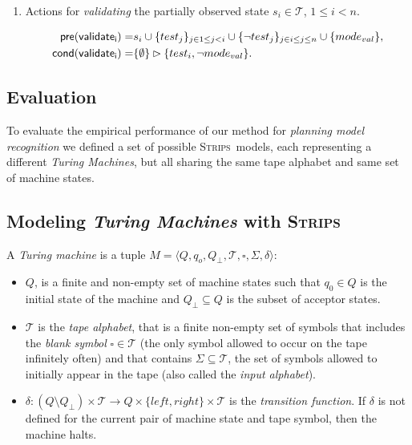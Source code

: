 \documentclass[letterpaper]{article} %
\newcommand{\tup}[1]{{\langle #1 \rangle}}
\newcommand{\pre}{\mathsf{pre}}     %
\newcommand{\cond}{\mathsf{cond}}   %
\newcommand{\strips}{\textsc{Strips}}     %
\begin{document}
\begin{itemize}
\begin{enumerate}
\item Actions for {\em validating} the partially observed state $s_i\in\mathcal{T}$, {\tt\small $1\leq i< n$}.
\begin{small}
\begin{align*}
\hspace*{7pt}\pre(\mathsf{validate_{i}})=&s_i\cup\{test_j\}_{j\in 1\leq j<i}\cup\{\neg test_j\}_{j\in i\leq j\leq n}\cup \{mode_{val}\},\\
\cond(\mathsf{validate_{i}})=&\{\emptyset\}\rhd\{test_i,\neg mode_{val}\}.
\end{align*}
\end{small}
\end{enumerate}
\end{itemize}



\subsection{Evaluation}
\label{sec:evaluation}
To evaluate the empirical performance of our method for {\em planning model recognition} we defined a set of possible \strips\ models, each representing a different {\em Turing Machines}, but all sharing the same tape alphabet and same set of machine states.

\subsection{Modeling {\em Turing Machines} with \strips\ }
A {\em Turing machine} is a tuple $M=\tup{Q,q_o,Q_{\bot},\mathcal{T},\square,\Sigma,\delta}$:
\begin{itemize}
\item $Q$, is a finite and non-empty set of machine states such that $q_0\in Q$ is the initial state of the machine and $Q_{\bot}\subseteq Q$ is the subset of acceptor states.  
\item $\mathcal{T}$ is the {\em tape alphabet}, that is a finite non-empty set of symbols that includes the {\em blank symbol} $\square\in\mathcal{T}$ (the only symbol allowed to occur on the tape infinitely often) and that contains $\Sigma\subseteq\mathcal{T}$, the set of symbols allowed to initially appear in the tape (also called the {\em input alphabet}).
\item $\delta: (Q\setminus Q_{\bot})\times \mathcal{T}\rightarrow Q\times\{left,right\}\times \mathcal{T}$ is the {\em transition function}. If $\delta$ is not defined for the current pair of machine state and tape symbol, then the machine halts.
\end{itemize}
\end{document}
